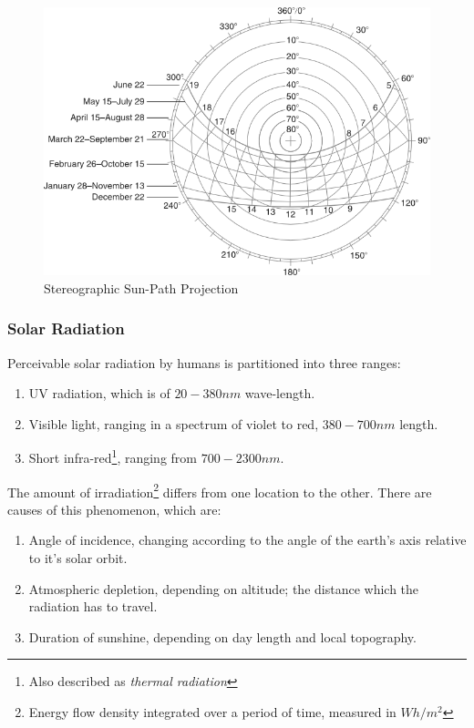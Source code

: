 \documentclass[a4paper,twoside,12pt,openright,final,oldfontcommands]{memoir}
\begin{document}
\begin{figure}[htbp]
\includegraphics[width=\textwidth]{./Images/4-Stereographic}
\caption[Stereographic Sun-Path Projection] {Stereographic Sun-Path Projection \cite{szokolay08}}
\label{Stereographic}
\end{figure}

\subsubsection{Solar Radiation}
Perceivable solar radiation by humans is partitioned into three ranges:
\begin{enumerate}
  \item UV radiation, which is of $20-380nm$ wave-length.
  \item Visible light, ranging in a spectrum of violet to red, $380-700nm$ length.
  \item Short infra-red\footnote{Also described as \emph{thermal radiation}}, ranging from
  $700-2300nm$.
\end{enumerate}
The amount of irradiation\footnote{Energy flow density integrated over a period of time, measured in
$Wh/m^2$} differs from one location to the other. There are causes of this
phenomenon\cite{szokolay08}, which are:
\begin{enumerate}
  \item Angle of incidence, changing according to the angle of the earth's axis relative to it's
  solar orbit.
  \item Atmospheric depletion, depending on altitude; the distance which the radiation has to
  travel.
  \item Duration of sunshine, depending on day length and local topography.
\end{enumerate}
\end{document}
